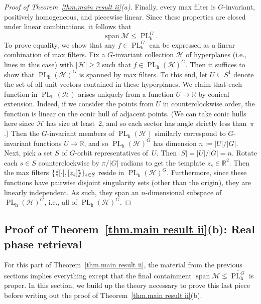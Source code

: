 \documentclass{article}
\theoremstyle{plain}
\theoremstyle{definition}
\newcommand{\llangle}{\langle\hspace{-2.5pt}\langle}
\newcommand{\rrangle}{\rangle\hspace{-2.5pt}\rangle}
\begin{document}
\begin{proof}[Proof of Theorem~\ref{thm.main result ii}(a)]
Finally, every max filter is $G$-invariant, positively homogeneous, and piecewise linear.
Since these properties are closed under linear combinations, it follows that
\[
\operatorname{span}\mathcal{M}
\leq \operatorname{PL}_{\operatorname{h}}^G.
\]
To prove equality, we show that any $f\in\operatorname{PL}_{\operatorname{h}}^G$ can be expressed as a linear combination of max filters.
Fix a $G$-invariant collection $\mathcal{H}$ of hyperplanes (i.e., lines in this case) with $|\mathcal{H}|\geq2$ such that $f\in\operatorname{PL}_{\operatorname{h}}(\mathcal{H})^G$.
Then it suffices to show that $\operatorname{PL}_{\operatorname{h}}(\mathcal{H})^G$ is spanned by max filters.
To this end, let $U\subseteq S^1$ denote the set of all unit vectors contained in these hyperplanes.
We claim that each function in $\operatorname{PL}_{\operatorname{h}}(\mathcal{H})$ arises uniquely from a function $U \to \mathbb{R}$ by conical extension.
Indeed, if we consider the points from $U$ in counterclockwise order, the function is linear on the conic hull of adjacent points.
(We can take conic hulls here since $\mathcal{H}$ has size at least~$2$, and so each sector has angle strictly less than~$\pi$.)
Then the $G$-invariant members of $\operatorname{PL}_{\operatorname{h}}(\mathcal{H})$ similarly correspond to $G$-invariant functions $U \to \mathbb{R}$, and so $\operatorname{PL}_{\operatorname{h}}(\mathcal{H})^G$ has dimension $n:=|U|/|G|$.
Next, pick a set $S$ of $G$-orbit representatives of~$U$.
Then $|S|=|U|/|G|=n$.
Rotate each $s\in S$ counterclockwise by $\pi/|G|$ radians to get the template $z_s\in\mathbb{R}^2$.
Then the max filters $\{\llangle[\cdot],[z_s]\rrangle\}_{s\in S}$ reside in $\operatorname{PL}_{\operatorname{h}}(\mathcal{H})^G$.
Furthermore, since these functions have pairwise disjoint singularity sets (other than the origin), they are linearly independent.
As such, they span an $n$-dimensional subspace of $\operatorname{PL}_{\operatorname{h}}(\mathcal{H})^G$, i.e., all of $\operatorname{PL}_{\operatorname{h}}(\mathcal{H})^G$.
\end{proof}

\subsection{Proof of Theorem~\ref{thm.main result ii}(b): Real phase retrieval}

For this part of Theorem~\ref{thm.main result ii}, the material from the previous sections implies everything except that the final containment $\overline{\operatorname{span}\mathcal{M}}
\lneq \overline{\operatorname{PL}_{\operatorname{h}}^G}$ is proper.
In this section, we build up the theory necessary to prove this last piece before writing out the proof of Theorem~\ref{thm.main result ii}(b).
\end{document}
